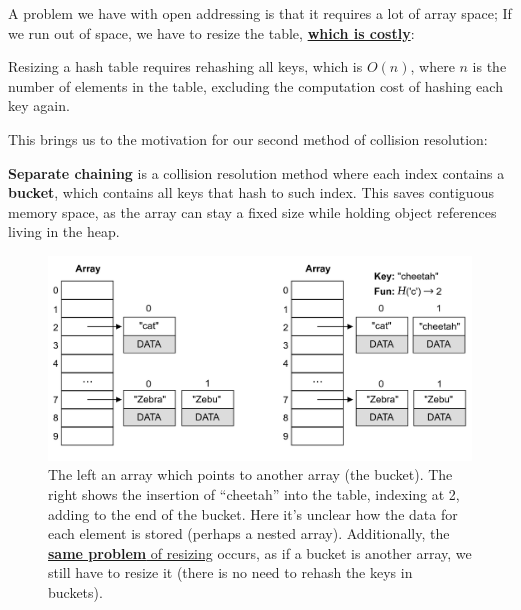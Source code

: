 \noindent
A problem we have with open addressing is that it requires a lot of array space; If we run out of space, we have to 
resize the table, \underline{\textbf{which is costly}}:

\begin{theo}

    \label{thm:resize_hash_table}
    Resizing a hash table requires rehashing all keys, which is $O(n)$, where $n$ is the number of elements in the table, 
    excluding the computation cost of hashing each key again.
\end{theo}

\newpage

\noindent
This brings us to the motivation for our second method of collision resolution:

\begin{Def}

    \label{def:separate_chaining}

    \textbf{Separate chaining} is a collision resolution method where each index contains a \textbf{bucket}, which contains 
    all keys that hash to such index. This saves contiguous memory space, as the array can stay a fixed size while holding object
    references living in the heap.
\end{Def}

\vspace{-1em}
\begin{figure}[ht!]

    \centering
    \includegraphics[width=\textwidth]{Sections/hash/separate_chaining.png}
    \caption{The left an array which points to another array (the bucket). The right shows the insertion of 
    ``cheetah'' into the table, indexing at 2, adding to the end of the bucket. Here it's unclear how the data for each element is stored (perhaps a nested array).
    Additionally, the \underline{\textbf{same problem} of resizing} occurs, as if a bucket is another array, we still have to resize it
    (there is no need to rehash the keys in buckets).}
    \label{fig:separate_chaining}
\end{figure}



